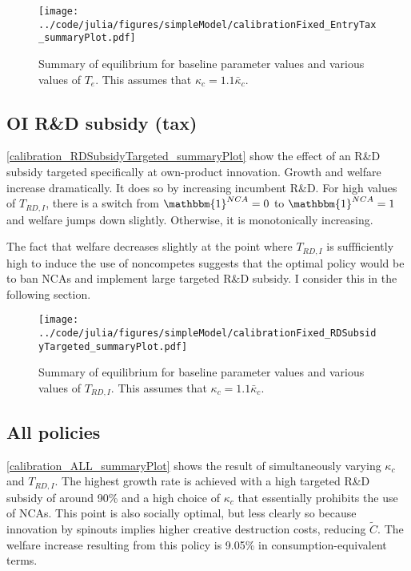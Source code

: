 \documentclass[11pt,english]{article}
\begin{document}
\begin{figure}[]
	\texttt{[image: ../code/julia/figures/simpleModel/calibrationFixed\_EntryTax\_summaryPlot.pdf]}
	\caption{Summary of equilibrium for baseline parameter values and various values of $T_e$. This assumes that $\kappa_c = 1.1 \bar{\kappa}_c$.}
	\label{calibration_entryTax_summaryPlot}
\end{figure}

\subsection{OI R\&D subsidy (tax)}\label{cs:oi_rd_subsidy}

\autoref{calibration_RDSubsidyTargeted_summaryPlot} show the effect of an R\&D subsidy targeted specifically at own-product innovation. Growth and welfare increase dramatically. It does so by increasing incumbent R\&D. For high values of $T_{RD,I}$, there is a switch from $\mathbbm{1}^{NCA} = 0$ to $\mathbbm{1}^{NCA} = 1$ and welfare jumps down slightly. Otherwise, it is monotonically increasing. 

The fact that welfare decreases slightly at the point where $T_{RD,I}$ is suffficiently high to induce the use of noncompetes suggests that the optimal policy would be to ban NCAs and implement large targeted R\&D subsidy. I consider this in the following section.

\begin{figure}[]
	\texttt{[image: ../code/julia/figures/simpleModel/calibrationFixed\_RDSubsidyTargeted\_summaryPlot.pdf]}
	\caption{Summary of equilibrium for baseline parameter values and various values of $T_{RD,I}$. This assumes that $\kappa_c = 1.1 \bar{\kappa}_c$.}
	\label{calibration_RDSubsidyTargeted_summaryPlot}
\end{figure}


\subsection{All policies}

\autoref{calibration_ALL_summaryPlot} shows the result of simultaneously varying $\kappa_c$ and $T_{RD,I}$. The highest growth rate is achieved with a high targeted R\&D subsidy of around 90\% and a high choice of $\kappa_c$ that essentially prohibits the use of NCAs. This point is also socially optimal, but less clearly so because innovation by spinouts implies higher creative destruction costs, reducing $\tilde{C}$. The welfare increase resulting from this policy is 9.05\% in consumption-equivalent terms.
\end{document}
